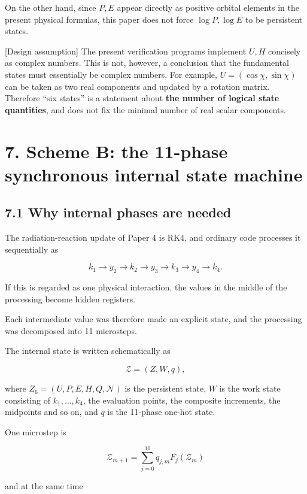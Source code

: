 \documentclass[
  a4paper,
]{article}
\begin{document}
On the other hand, since \(P,E\) appear directly as positive orbital
elements in the present physical formulas, this paper does not force
\(\log P,\log E\) to be persistent states.

{[}Design assumption{]} The present verification programs implement
\(U,H\) concisely as complex numbers. This is not, however, a conclusion
that the fundamental states must essentially be complex numbers. For
example, \(U=(\cos\chi,\sin\chi)\) can be taken as two real components
and updated by a rotation matrix. Therefore ``six states'' is a
statement about \textbf{the number of logical state quantities}, and
does not fix the minimal number of real scalar components.

\section{7. Scheme B: the 11-phase synchronous internal state
machine}\label{scheme-b-the-11-phase-synchronous-internal-state-machine}

\subsection{7.1 Why internal phases are
needed}\label{why-internal-phases-are-needed}

The radiation-reaction update of Paper 4 is RK4, and ordinary code
processes it sequentially as

\[
k_1\rightarrow y_2\rightarrow k_2\rightarrow y_3\rightarrow k_3\rightarrow y_4\rightarrow k_4.
\]

If this is regarded as one physical interaction, the values in the
middle of the processing become hidden registers.

Each intermediate value was therefore made an explicit state, and the
processing was decomposed into 11 microsteps.

The internal state is written schematically as

\[
\mathcal Z
=(Z,W,q),
\]

where \(Z_6=(U,P,E,H,Q,\mathcal N)\) is the persistent state, \(W\) is
the work state consisting of \(k_1,\ldots,k_4\), the evaluation points,
the composite increments, the midpoints and so on, and \(q\) is the
11-phase one-hot state.

One microstep is

\[
\boxed{
\mathcal Z_{m+1}
=
\sum_{j=0}^{10}q_{j,m}F_j(\mathcal Z_m)
}
\]

and at the same time
\end{document}
